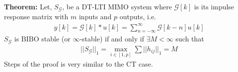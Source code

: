 \documentclass[twoside]{article}
\begin{document}
\textbf{Theorem:} Let, $S_{\mathcal{G}}$, be a DT-LTI MIMO system where $\mathcal{G}[k]$ is its impulse response matrix
with $m$ inputs and $p$ outputs, i.e.
%
\begin{align*}
y[k] = \mathcal{G}[k] * u[k] = \sum\limits_{n=-\infty}^{\infty} \mathcal{G}[k - n] u[k] 
\end{align*}
%
$S_{\mathcal{G}}$ is BIBO stable (or $\infty$-stable) if and only if $\exists M < \infty$ such that 
%
\begin{align*}
	|| S_{\mathcal{G}} ||_1 =\underset{i \in [1,p]}{\max} \sum\limits || h_{ij} ||_1 = M
\end{align*}
%
Steps of the proof is very similar to the CT case.

\end{document}
